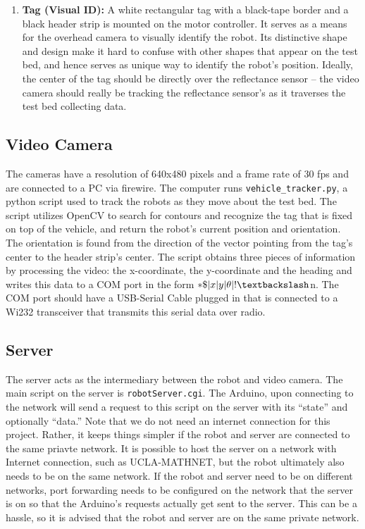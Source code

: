 \documentclass[english]{article}\usepackage[]{graphicx}\usepackage[]{color}
\begin{document}
\begin{enumerate}
\item \textbf{Tag (Visual ID):} A white rectangular tag with a black-tape border and a black header strip is mounted on the motor controller. It serves as a means for the overhead camera to visually identify the robot. Its distinctive shape and design make it hard to confuse with other shapes that appear on the test bed, and hence serves as unique way to identify the robot's position. Ideally, the center of the tag should be directly over the reflectance sensor -- the video camera should really be tracking the reflectance sensor's as it traverses the test bed collecting data.
\end{enumerate}

\subsection{Video Camera}
The cameras have a resolution of 640x480 pixels and a frame rate of 30 fps and are connected to a PC via
firewire. The computer runs \texttt{vehicle\_tracker.py}, a python script used to track the robots as
they move about the test bed. The script utilizes OpenCV to search for contours and recognize the tag
that is fixed on top of the vehicle, and return the robot's current position and orientation. The
orientation is found from the direction of the vector pointing from the tag's center to the header
strip's center. The script obtains three pieces of information by processing the video: the x-coordinate,
the y-coordinate and the heading and writes this data to a COM port in the form $*\$|x|y|\theta|!\textbackslash$n. The COM port should have a USB-Serial Cable plugged in that is connected to a Wi232 transceiver that transmits this serial data over radio.

\subsection{Server}

The server acts as the intermediary between the robot and video camera. The main script on the server is \texttt{robotServer.cgi}. The Arduino, upon connecting to the network will send a request to this script on the
server with its ``state'' and optionally ``data.'' Note that we do not need an internet connection for this project. Rather, it keeps things simpler if the robot and server are connected to the same priavte network. It is possible to host the server on a network with Internet connection, such as UCLA-MATHNET, but the robot ultimately also needs to be on the same network. If the robot and server need to be on different networks, port forwarding needs to be configured on the network that the server is on so that the Arduino's requests actually get sent to the server. This can be a hassle, so it is advised that the robot and server are on the same private network.
\end{document}
